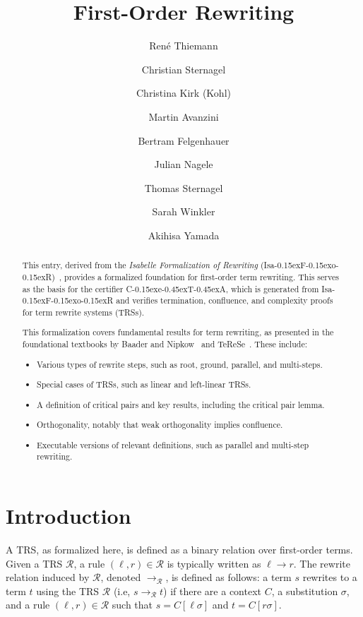 \documentclass[11pt,a4paper]{article}
\newcommand\isafor{\textsf{Isa\kern-0.15exF\kern-0.15exo\kern-0.15exR}}
\newcommand\ceta{\textsf{C\kern-0.15exe\kern-0.45exT\kern-0.45exA}}
\begin{document}
\title{First-Order Rewriting}
\author{René Thiemann}
\author{Christian Sternagel}
\author{Christina Kirk (Kohl)}
\author{Martin Avanzini}
\author{Bertram Felgenhauer}
\author{Julian Nagele}
\author{Thomas Sternagel}
\author{Sarah Winkler}
\author{Akihisa Yamada}
\maketitle

\begin{abstract}
  This entry, derived from the \emph{Isabelle Formalization of Rewriting}
  (\isafor)~\cite{TS09}, provides a formalized foundation for first-order
  term rewriting. This serves as the basis for the certifier \ceta, which is
  generated from \isafor{} and verifies termination, confluence, and complexity
  proofs for term rewrite systems (TRSs).

  This formalization covers fundamental results for term rewriting, as presented
  in the foundational textbooks by Baader and Nipkow~\cite{BN98} and TeReSe~\cite{TeReSe}.
  These include:
  \begin{itemize}
    \item Various types of rewrite steps, such as root, ground, parallel, and multi-steps.
    \item Special cases of TRSs, such as linear and left-linear TRSs.
    \item A definition of critical pairs and key results, including the critical pair lemma.
    \item Orthogonality, notably that weak orthogonality implies confluence.
    \item Executable versions of relevant definitions, such as parallel and multi-step rewriting.
  \end{itemize}

\end{abstract}

\tableofcontents

\section{Introduction}

A TRS, as formalized here, is defined as a binary relation over first-order terms.
Given a TRS $\mathcal{R}$, a rule $(\ell, r) \in \mathcal{R}$ is typically
written as $\ell \to r$. The rewrite relation induced by $\mathcal{R}$,
denoted $\to_{\mathcal{R}}$, is defined as follows:
a term $s$ rewrites to a term $t$ using the TRS $\mathcal{R}$ (i.e,
$s \to_\mathcal{R} t$) if there are a context $C$, a substitution $\sigma$,
and a rule $(\ell, r) \in \mathcal{R}$ such that $s = C[\ell\sigma]$ and
$t = C[r\sigma]$.
\end{document}
